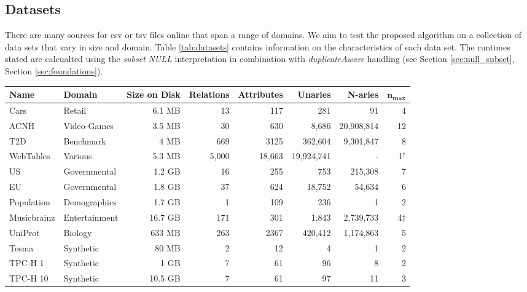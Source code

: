 \subsection{Datasets}\label{subsec:datasets}
There are many sources for csv or tsv files online that span a range of domains. We aim to test the proposed algorithm on a collection of data sets that vary in size and domain. Table \ref{tab:datasets} contains information on the characteristics of each data set. The runtimes stated are calcualted using the \textit{subset} \textit{NULL} interpretation in combination with \textit{duplicateAware} handling (see Section \ref{sec:null_subset}, Section \ref{sec:foundations}).

\begin{table*}[t]
    \centering
    \begin{tabular}{llrrrrrr}
        \hline
        \textbf{Name} & \textbf{Domain} & \textbf{Size on Disk} & \textbf{Relations} & \textbf{Attributes} & \textbf{Unaries} & \textbf{N-aries} & $\textbf{n}_\textbf{max}$ \\
        \hline
        Cars & Retail & 6.1 MB & 13 & 117 & 281 & 91 & 4 \\
        ACNH & Video-Games & 3.5 MB & 30 & 630 & 8,686 & 20,908,814 & 12 \\
        T2D & Benchmark & 4 MB & 669 & 3125 & 362,604 & 9,301,847 & 8 \\
        WebTables & Various & 5.3 MB & 5,000 & 18,663 & 19,924,741 & - & 1$^\dag$ \\
        US & Governmental & 1.2 GB & 16 & 255 & 753 & 215,308 & 7 \\
        EU & Governmental & 1.8 GB & 37 & 624 & 18,752 & 54,634 & 6 \\
        Population & Demographics & 1.7 GB & 1 & 109 & 236 & 1 & 2 \\
        Musicbrainz & Entertainment & 16.7 GB & 171 & 301 & 1,843 & 2,739,733 & 4$\dag$ \\
        UniProt & Biology & 633 MB & 263 & 2367 & 420,412 & 1,174,863 & 5 \\
        Tesma & Synthetic & 80 MB & 2 & 12 & 4 & 1 & 2 \\
        TPC-H 1 & Synthetic & 1 GB & 7 & 61 & 96 & 8 & 2 \\
        TPC-H 10 & Synthetic & 10.5 GB & 7 & 61 & 97 & 11 & 3 \\
        \hline
    \end{tabular}
    \caption{Datasets and their characteristics. Max n-ary layers marked with $^\dag$ are user defined limits.}
    \label{tab:datasets}
\end{table*}

